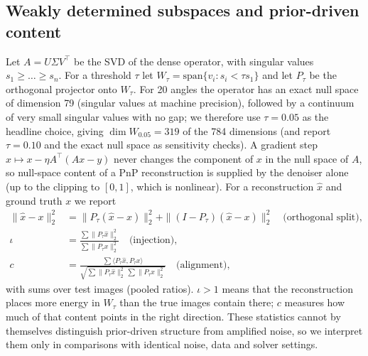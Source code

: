 \subsection{Weakly determined subspaces and prior-driven content}\label{sec:subspace}
Let $A=U\Sigma V^{\top}$ be the SVD of the dense operator, with singular values $s_1\ge\dots\ge s_n$. For a
threshold $\tau$ let $W_\tau=\mathrm{span}\{v_i : s_i<\tau s_1\}$ and let $P_\tau$ be the orthogonal projector onto
$W_\tau$. For 20 angles the operator has an exact null space of dimension 79 (singular values at machine precision),
followed by a continuum of very small singular values with no gap; we therefore use $\tau=0.05$ as the headline
choice, giving $\dim W_{0.05}=319$ of the 784 dimensions (and report $\tau=0.10$ and the exact null space as
sensitivity checks). A gradient step $x\mapsto x-\eta A^\top(Ax-y)$ never changes the component of $x$ in the null
space of $A$, so null-space content of a PnP reconstruction is supplied by the denoiser alone (up to the clipping to $[0,1]$, which is nonlinear). For a reconstruction
$\hat x$ and ground truth $x$ we report
\begin{align}
\|\hat x-x\|_2^2 &= \|P_\tau(\hat x-x)\|_2^2+\|(I-P_\tau)(\hat x-x)\|_2^2 \quad\text{(orthogonal split)},\\
\iota &= \frac{\sum\|P_\tau\hat x\|_2^2}{\sum\|P_\tau x\|_2^2}\quad\text{(injection)},\\
c &= \frac{\sum\langle P_\tau\hat x,P_\tau x\rangle}{\sqrt{\sum\|P_\tau\hat x\|_2^2\,\sum\|P_\tau x\|_2^2}}\quad\text{(alignment)},
\end{align}
with sums over test images (pooled ratios). $\iota>1$ means that the reconstruction places more energy in
$W_\tau$ than the true images contain there; $c$ measures how much of that content points in the right direction.
These statistics cannot by themselves distinguish prior-driven structure from amplified noise, so we interpret them
only in comparisons with identical noise, data and solver settings.

